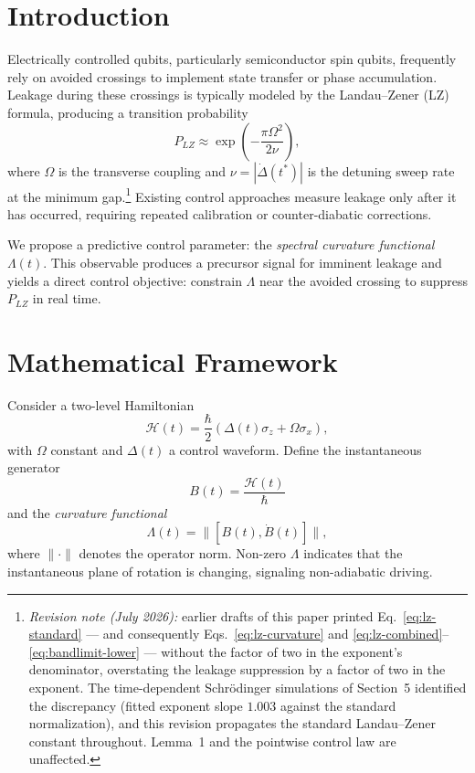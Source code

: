 \documentclass[11pt]{article}
\begin{document}
\section{Introduction}

Electrically controlled qubits, particularly semiconductor spin qubits, frequently rely on avoided crossings to implement state transfer or phase accumulation. Leakage during these crossings is typically modeled by the Landau--Zener (LZ) formula, producing a transition probability
\begin{equation}
    P_{LZ} \approx \exp\left(-\frac{\pi\Omega^2}{2\nu}\right),
    \label{eq:lz-standard}
\end{equation}
where $\Omega$ is the transverse coupling and $\nu = |\dot{\Delta}(t^*)|$ is the detuning sweep rate at the minimum gap.\footnote{\textit{Revision note (July 2026):} earlier drafts of this paper printed Eq.~\eqref{eq:lz-standard} --- and consequently Eqs.~\eqref{eq:lz-curvature} and \eqref{eq:lz-combined}--\eqref{eq:bandlimit-lower} --- without the factor of two in the exponent's denominator, overstating the leakage suppression by a factor of two in the exponent. The time-dependent Schr\"odinger simulations of Section~5 identified the discrepancy (fitted exponent slope $1.003$ against the standard normalization), and this revision propagates the standard Landau--Zener constant throughout. Lemma~1 and the pointwise control law are unaffected.} Existing control approaches measure leakage only after it has occurred, requiring repeated calibration or counter-diabatic corrections.

We propose a predictive control parameter: the \emph{spectral curvature functional} $\Lambda(t)$. This observable produces a precursor signal for imminent leakage and yields a direct control objective: constrain $\Lambda$ near the avoided crossing to suppress $P_{LZ}$ in real time.

\section{Mathematical Framework}

Consider a two-level Hamiltonian
\begin{equation}
    \mathcal{H}(t) = \frac{\hbar}{2}(\Delta(t)\sigma_z + \Omega\sigma_x),
    \label{eq:hamiltonian}
\end{equation}
with $\Omega$ constant and $\Delta(t)$ a control waveform. Define the instantaneous generator
\[
    B(t) = \frac{\mathcal{H}(t)}{\hbar}
\]
and the \emph{curvature functional}
\begin{equation}
    \Lambda(t) = \|[B(t), \dot{B}(t)]\|,
    \label{eq:curvature-def}
\end{equation}
where $\|\cdot\|$ denotes the operator norm. Non-zero $\Lambda$ indicates that the instantaneous plane of rotation is changing, signaling non-adiabatic driving.
\end{document}
